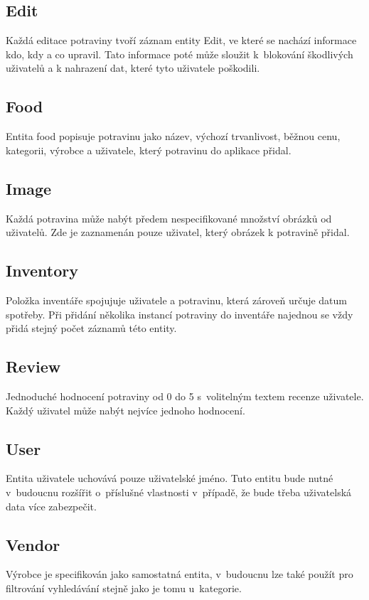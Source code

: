 \documentclass[thesis=B,czech]{FITthesis}[2013/10/20]
\begin{document}
\subsection{Edit}
Každá editace potraviny tvoří záznam entity Edit, ve které se nachází informace kdo, kdy a co upravil. Tato informace poté může sloužit k~blokování škodlivých uživatelů a k nahrazení dat, které tyto uživatele poškodili.

\subsection{Food}
Entita food popisuje potravinu jako název, výchozí trvanlivost, běžnou cenu, kategorii, výrobce a uživatele, který potravinu do aplikace přidal.

\subsection{Image}
Každá potravina může nabýt předem nespecifikované množství obrázků od uživatelů. Zde je zaznamenán pouze uživatel, který obrázek k potravině přidal.

\subsection{Inventory}
Položka inventáře spojujuje uživatele a potravinu, která zároveň určuje datum spotřeby. Při přidání několika instancí potraviny do inventáře najednou se vždy přidá stejný počet záznamů této entity.

\subsection{Review}
Jednoduché hodnocení potraviny od 0 do 5 s~volitelným textem recenze uživatele. Každý uživatel může nabýt nejvíce jednoho hodnocení.

\subsection{User}
Entita uživatele uchovává pouze uživatelské jméno. Tuto entitu bude nutné v~budoucnu rozšířit o~příslušné vlastnosti v~případě, že bude třeba uživatelská data více zabezpečit.

\subsection{Vendor}
Výrobce je specifikován jako samostatná entita, v~budoucnu lze také použít pro filtrování vyhledávání stejně jako je tomu u~kategorie.
\end{document}
